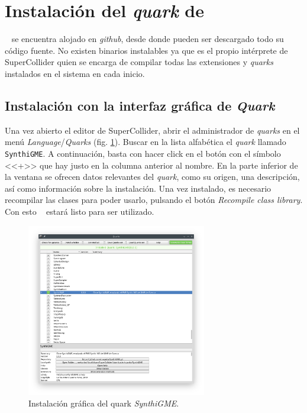 \section[Instalación del \textit{quark}\dots]
{Instalación del \textit{quark} de \appName {}}


\appName~ se encuentra alojado en \textit{github}, desde donde pueden ser descargado todo su código fuente. No existen binarios instalables ya que es el propio intérprete de SuperCollider quien se encarga de compilar todas las extensiones y \textit{quarks} instalados en el sistema en cada inicio.

\subsection{Instalación con la interfaz gráfica de \textit{Quark}}

Una vez abierto el editor de SuperCollider, abrir el administrador de \textit{quarks} en el menú \textit{Language}/\textit{Quarks} (fig. \ref{fig:quark_ide}). Buscar en la lista alfabética el \textit{quark} llamado \texttt{SynthiGME}. A continuación, basta con hacer click en el botón con el símbolo <<+>> que hay justo en la columna anterior al nombre. En la parte inferior de la ventana se ofrecen datos relevantes del \textit{quark}, como su origen, una descripción, así como información sobre la instalación. Una vez instalado, es necesario recompilar las clases para poder usarlo, pulsando el botón \textit{Recompile class library}. Con esto \appName~ estará listo para ser utilizado.

\begin{figure}[H]
	\centering
	\includegraphics[width=0.7\textwidth]{quark_ide}
	\caption[Instalación gráfica del quark \texttt{SynthiGME}]{Instalación gráfica del quark \textit{SynthiGME}.}
	\label{fig:quark_ide}
\end{figure}


